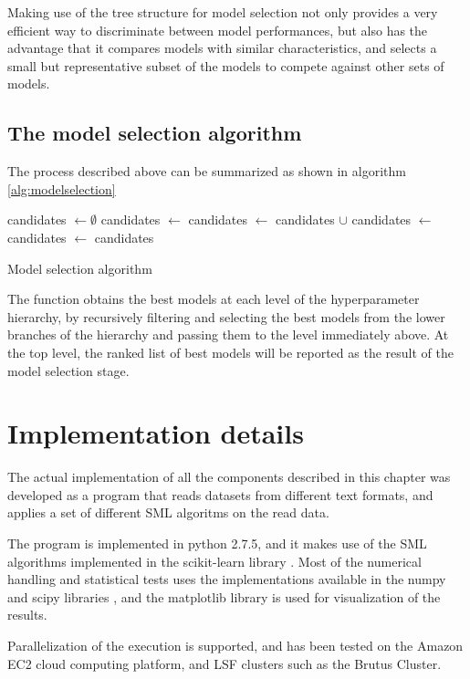 Making use of the tree structure for model selection not only provides a very efficient way to
discriminate between model performances, but also has the advantage that it compares models with
similar characteristics, and selects a small but representative subset of the models to compete
against other sets of models.

\subsection{The model selection algorithm}
The process described above can be summarized as shown in algorithm \ref{alg:modelselection}

\begin{algorithm}[here]
	\begin{algorithmic}
			\State candidates $\gets \emptyset$
				\State candidates $\gets$ 
			\Else
					\State candidates $\gets$ candidates $\cup$ 
				\EndFor
			\EndIf
			\State candidates $\gets$ 
			\State candidates $\gets$ 
			\State\Return candidates
		\EndFunction
	\end{algorithmic}
	\caption{Model selection algorithm}
	\label{alg:modelselection}
\end{algorithm}

The function obtains the best models at each level of the hyperparameter hierarchy, by recursively
filtering and selecting the best models from the lower branches of the hierarchy and passing them to
the level immediately above. At the top level, the ranked list of best models will be reported as
the result of the model selection stage.

\section{Implementation details}

The actual implementation of all the components described in this chapter was developed as a program
that reads datasets from different text formats, and applies a set of different SML algoritms on the read data.

The program is implemented in python 2.7.5, and it makes use of the SML algorithms implemented in
the scikit-learn library \cite{scikit-learn}. Most of the numerical handling and statistical tests
uses the implementations available in the numpy and scipy libraries \cite{scipy}, and the matplotlib
library \cite{matplotlib} is used for visualization of the results.


Parallelization of the execution is supported, and has been tested on the Amazon EC2 cloud computing
platform, and LSF clusters such as the Brutus Cluster.
